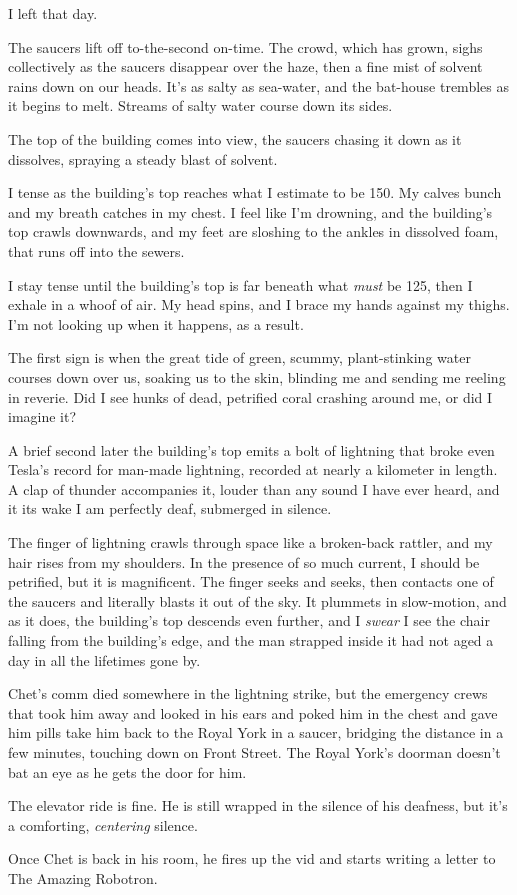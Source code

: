 I left that day.

\tb

The saucers lift off to-the-second on-time. The crowd, which has
grown, sighs collectively as the saucers disappear over the haze,
then a fine mist of solvent rains down on our heads. It's as salty
as sea-water, and the bat-house trembles as it begins to melt.
Streams of salty water course down its sides.

The top of the building comes into view, the saucers chasing it
down as it dissolves, spraying a steady blast of solvent.

I tense as the building's top reaches what I estimate to be 150. My
calves bunch and my breath catches in my chest. I feel like I'm
drowning, and the building's top crawls downwards, and my feet are
sloshing to the ankles in dissolved foam, that runs off into the
sewers.

I stay tense until the building's top is far beneath what
\emph{must} be 125, then I exhale in a whoof of air. My head spins,
and I brace my hands against my thighs. I'm not looking up when it
happens, as a result.

The first sign is when the great tide of green, scummy,
plant-stinking water courses down over us, soaking us to the skin,
blinding me and sending me reeling in reverie. Did I see hunks of
dead, petrified coral crashing around me, or did I imagine it?

A brief second later the building's top emits a bolt of lightning
that broke even Tesla's record for man-made lightning, recorded at
nearly a kilometer in length. A clap of thunder accompanies it,
louder than any sound I have ever heard, and it its wake I am
perfectly deaf, submerged in silence.

The finger of lightning crawls through space like a broken-back
rattler, and my hair rises from my shoulders. In the presence of so
much current, I should be petrified, but it is magnificent. The
finger seeks and seeks, then contacts one of the saucers and
literally blasts it out of the sky. It plummets in slow-motion, and
as it does, the building's top descends even further, and I
\emph{swear} I see the chair falling from the building's edge, and
the man strapped inside it had not aged a day in all the lifetimes
gone by.

\tb

Chet's comm died somewhere in the lightning strike, but the
emergency crews that took him away and looked in his ears and poked
him in the chest and gave him pills take him back to the Royal York
in a saucer, bridging the distance in a few minutes, touching down
on Front Street. The Royal York's doorman doesn't bat an eye as he
gets the door for him.

The elevator ride is fine. He is still wrapped in the silence of
his deafness, but it's a comforting, \emph{centering} silence.

Once Chet is back in his room, he fires up the vid and starts
writing a letter to The Amazing Robotron.


